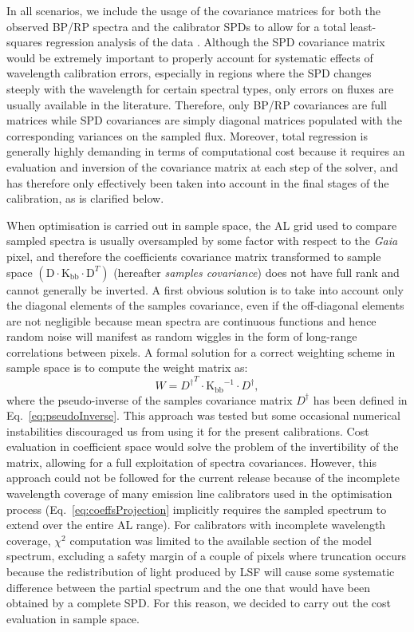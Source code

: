 \documentclass{aa}
\newcommand{\gaia}{\textit{Gaia}\xspace}
\newcommand{\wrt}{with respect to\xspace}
\newcommand{\equref}[1]{Eq.~\ref{eq:#1}}
\begin{document}
In all scenarios, we include the usage of the covariance matrices for both the observed BP/RP spectra and the calibrator SPDs to allow for a total least-squares regression analysis of the data \citep{huffell}. Although the SPD covariance matrix would be extremely important to properly account for systematic effects of wavelength calibration errors, especially in regions where the SPD changes steeply with the wavelength for certain spectral types, only errors on fluxes are usually available in the literature. Therefore, only BP/RP covariances are full matrices
while SPD covariances are simply diagonal matrices populated with the corresponding variances on the sampled flux. Moreover, total regression is generally highly demanding in terms of computational cost because it requires an evaluation and inversion of the covariance matrix at each step of the solver, and has therefore only effectively been taken into account in the final stages of the calibration, as is clarified below.

When optimisation is carried out in sample space,
the AL grid used to compare sampled spectra is usually oversampled by some factor \wrt the \gaia pixel, and therefore the coefficients covariance matrix transformed to sample space $(\mathrm{D} \cdot \textrm{K}_\textrm{bb} \cdot \mathrm{D}^T)$ (hereafter \emph{samples covariance}) does not have full rank and cannot generally be inverted. A first obvious solution is to take into account only the diagonal elements of the samples covariance, even if the off-diagonal elements are not negligible because mean spectra are continuous functions and hence random noise will manifest as random wiggles
in the form of long-range correlations between pixels.
A formal solution for a correct weighting scheme in sample space is to compute the weight matrix as:
\begin{equation}
W = {D^\dagger}^T \cdot \mathrm{K_{bb}}^{-1}\cdot D^\dagger
\label{eq:fullWeight}
,\end{equation}
where the pseudo-inverse of the samples covariance matrix $D^\dagger$ has been defined in \equref{pseudoInverse}. 
This approach was tested but some occasional numerical instabilities discouraged us from using it for the present calibrations. 
Cost evaluation in coefficient space would solve the problem of the invertibility of the matrix, allowing for a full exploitation of spectra covariances. However, this approach could not be followed for the current release because of the incomplete wavelength coverage of many emission line calibrators used in the optimisation process (\equref{coeffsProjection} implicitly requires the sampled spectrum 
to extend over the entire AL range). For  calibrators with incomplete wavelength coverage, $\chi^2$ computation was limited to the available section of the model spectrum, excluding a safety margin of a couple of pixels where truncation occurs because the redistribution of light produced by LSF will cause some systematic difference between the partial spectrum and the one that would have been obtained by a complete SPD.
For this reason, we decided to carry out the cost evaluation in sample space.
\end{document}
